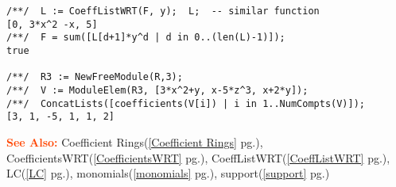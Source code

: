 \documentclass[a4paper]{mybook}
\newenvironment{command}{}{} %
\newcommand\SeeAlso{\par\textcolor{OrangeRed}{\textbf{\large See Also: }}}
\begin{document}
\begin{command}
\begin{Verbatim}[label=example, rulecolor=\color{PineGreen}, frame=single]
/**/  L := CoeffListWRT(F, y);  L;  -- similar function
[0, 3*x^2 -x, 5]
/**/  F = sum([L[d+1]*y^d | d in 0..(len(L)-1)]);
true

/**/  R3 := NewFreeModule(R,3);
/**/  V := ModuleElem(R3, [3*x^2+y, x-5*z^3, x+2*y]);
/**/  ConcatLists([coefficients(V[i]) | i in 1..NumCompts(V)]);
[3, 1, -5, 1, 1, 2]
\end{Verbatim}


\SeeAlso %
  Coefficient Rings(\ref{Coefficient Rings} pg.\pageref{Coefficient Rings}), 
    CoefficientsWRT(\ref{CoefficientsWRT} pg.\pageref{CoefficientsWRT}), 
    CoeffListWRT(\ref{CoeffListWRT} pg.\pageref{CoeffListWRT}), 
    LC(\ref{LC} pg.\pageref{LC}), 
    monomials(\ref{monomials} pg.\pageref{monomials}), 
    support(\ref{support} pg.\pageref{support})
\end{command} %
\end{document}
